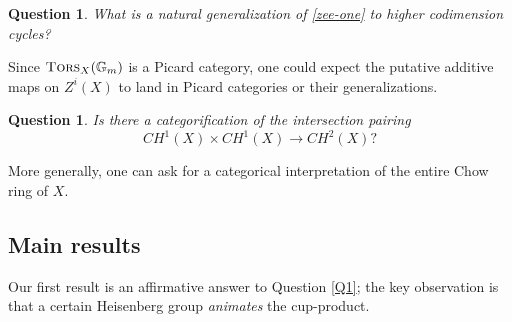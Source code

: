 \documentclass{amsart}
\numberwithin{equation}{subsection}
\newtheorem{question}[theorem]{Question}
\theoremstyle{remark}
\theoremstyle{remark}
\newcommand{\bbG}{\mathbb{G}}
\DeclareMathOperator{\tors}{\textsc{Tors}} %
\begin{document}
\begin{enumerate}
\begin{question}\label{Q2}
What is a natural generalization of \eqref{zee-one} to higher codimension cycles?
\end{question}
Since $\tors_X(\bbG_m)$ is a Picard category, one could expect the putative additive maps  on $Z^i(X)$ to land in Picard categories or their generalizations.  
\begin{question}\label{Q3}  Is there a categorification of the intersection pairing
\begin{equation}\label{int-pairing}
CH^1(X) \times CH^1(X) \to CH^2(X)?
\end{equation}
\end{question}
More generally, one can ask for a categorical interpretation of the entire Chow ring of $X$. 
 \end{enumerate} 

   
\subsection*{Main results} 

 Our first result is an affirmative answer to Question \ref{Q1}; the key observation is that a certain Heisenberg group \emph{animates} the cup-product. 
\end{document}
